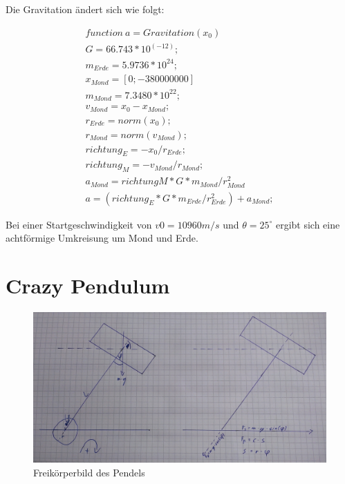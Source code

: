 \documentclass[10pt,a4paper]{article}
\begin{document}
Die Gravitation ändert sich wie folgt:

\begin{align}
function \:  a = Gravitation(x_0)
\\G = 66.743 * 10^(-12); \nonumber %
\\m_{Erde} = 5.9736 * 10^24; \nonumber%
\\x_{Mond} = [0 ; -380000000] \nonumber%
\\m_{Mond} = 7.3480 * 10^22; \nonumber%
\\v_{Mond} =  x_0 - x_{Mond}; \nonumber%
\\r_{Erde} = norm(x_0); \nonumber%
\\r_{Mond} = norm(v_{Mond}); \nonumber%
\\richtung_E = -x_0 / r_{Erde}; \nonumber%
\\richtung_M = -v_{Mond} / r_{Mond}; \nonumber%
\\a_{Mond} = richtungM * G * m_{Mond} / r_{Mond}^2 \nonumber
\\a = (richtung_E * G * m_{Erde} / r_{Erde}^2) + a_{Mond}; \nonumber%
\end{align}

Bei einer Startgeschwindigkeit von $v0 = 10960 m / s$ und $\theta = 25^\circ$ ergibt sich eine achtförmige Umkreisung um Mond und Erde.

\section{Crazy Pendulum}

	\begin{figure}[H]
 		\centering
 		\includegraphics[width=1\textwidth]{../aufgabe2/Freikoerper.jpg}
 		\caption{Freikörperbild des Pendels}
 	\end{figure}
\end{document}
